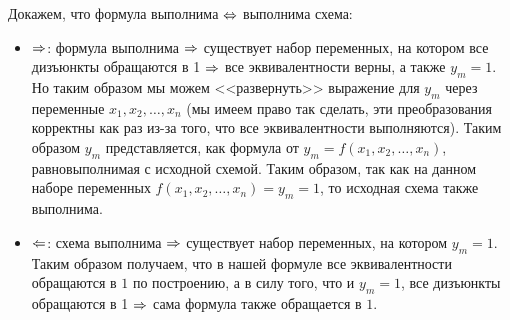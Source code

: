 \documentclass[a4paper,12pt]{article}
\begin{document}
\begin{solution}
	
	Докажем, что формула выполнима $\Leftrightarrow$ выполнима схема:
	
	\begin{itemize}
		\item $\Rightarrow$: формула выполнима $\Rightarrow$ существует набор переменных, на котором все дизъюнкты обращаются в 1 $\Rightarrow$ все эквивалентности верны, а также $y_m = 1$. Но таким образом мы можем <<развернуть>> выражение для $y_m$ через переменные $x_1, x_2, \ldots, x_n$ (мы имеем право так сделать, эти преобразования корректны как раз из-за того, что все эквивалентности выполняются). Таким образом $y_m$ представляется, как формула от $y_m = f(x_1, x_2, \ldots, x_n)$, равновыполнимая с исходной схемой. Таким образом, так как на данном наборе переменных $f(x_1, x_2, \ldots, x_n) = y_m = 1$, то исходная схема также выполнима.
		
		\item $\Leftarrow$: схема выполнима $\Rightarrow$ существует набор переменных, на котором $y_m = 1$. Таким образом получаем, что в нашей формуле все эквивалентности обращаются в $1$ по построению, а в силу того, что и $y_m=1$, все дизъюнкты обращаются в 1 $\Rightarrow$ сама формула также обращается в $1$.
	\end{itemize}
	
\end{solution}
\end{document}
